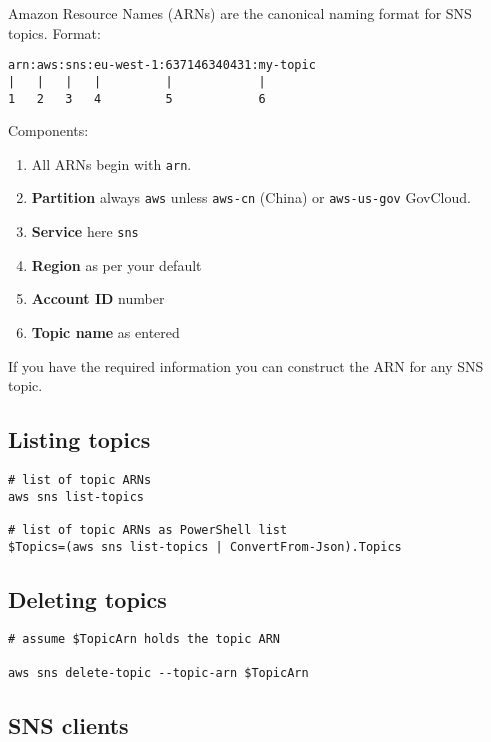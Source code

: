 \documentclass{pgnotes}
\begin{document}
Amazon Resource Names (ARNs) are the canonical naming format for SNS
topics. Format:

\begin{verbatim}
arn:aws:sns:eu-west-1:637146340431:my-topic
|   |   |   |         |            |
1   2   3   4         5            6
\end{verbatim}

Components:

\begin{enumerate}
\def\labelenumi{\arabic{enumi}.}
\item
  All ARNs begin with \texttt{arn}.
\item
  \textbf{Partition} always \texttt{aws} unless \texttt{aws-cn} (China)
  or \texttt{aws-us-gov} GovCloud.
\item
  \textbf{Service} here \texttt{sns}
\item
  \textbf{Region} as per your default
\item
  \textbf{Account ID} number
\item
  \textbf{Topic name} as entered
\end{enumerate}

If you have the required information you can construct the ARN for any
SNS topic.

\subsection{Listing topics}\label{listing-topics}

\begin{verbatim}
# list of topic ARNs
aws sns list-topics

# list of topic ARNs as PowerShell list
$Topics=(aws sns list-topics | ConvertFrom-Json).Topics
\end{verbatim}

\subsection{Deleting topics}\label{deleting-topics}

\begin{verbatim}
# assume $TopicArn holds the topic ARN

aws sns delete-topic --topic-arn $TopicArn
\end{verbatim}

\subsection{SNS clients}\label{sns-clients}
\end{document}
